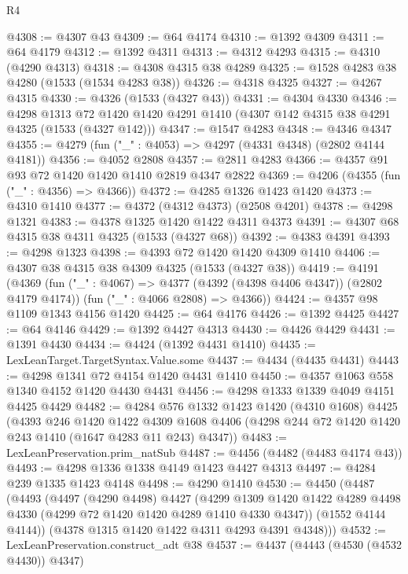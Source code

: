 \begin{lexlean}{R4}
\begin{coremodule}
@4308 := @4307 @43
@4309 := @64 @4174
@4310 := @1392 @4309
@4311 := @64 @4179
@4312 := @1392 @4311
@4313 := @4312 @4293
@4315 := @4310 (@4290 @4313)
@4318 := @4308 @4315 @38 @4289
@4325 := @1528 @4283 @38 @4280 (@1533 (@1534 @4283 @38))
@4326 := @4318 @4325
@4327 := @4267 @4315
@4330 := @4326 (@1533 (@4327 @43))
@4331 := @4304 @4330
@4346 := @4298
    @1313
    @72
    @1420
    @1420
    @4291
    @1410
    (@4307 @142 @4315 @38 @4291 @4325 (@1533 (@4327 @142)))
@4347 := @1547 @4283
@4348 := @4346 @4347
@4355 := @4279 (fun ("_" : @4053) => @4297 (@4331 @4348) (@2802 @4144 @4181))
@4356 := @4052 @2808
@4357 := @2811 @4283
@4366 := @4357 @91 @93 @72 @1420 @1420 @1410 @2819 @4347 @2822
@4369 := @4206 (@4355 (fun ("_" : @4356) => @4366))
@4372 := @4285 @1326 @1423 @1420
@4373 := @4310 @1410
@4377 := @4372 (@4312 @4373) (@2508 @4201)
@4378 := @4298 @1321
@4383 := @4378 @1325 @1420 @1422 @4311 @4373
@4391 := @4307 @68 @4315 @38 @4311 @4325 (@1533 (@4327 @68))
@4392 := @4383 @4391
@4393 := @4298 @1323
@4398 := @4393 @72 @1420 @1420 @4309 @1410
@4406 := @4307 @38 @4315 @38 @4309 @4325 (@1533 (@4327 @38))
@4419 := @4191
    (@4369
      (fun ("_" : @4067) => @4377 (@4392 (@4398 @4406 @4347)) (@2802 @4179 @4174))
      (fun ("_" : @4066 @2808) => @4366))
@4424 := @4357 @98 @1109 @1343 @4156 @1420
@4425 := @64 @4176
@4426 := @1392 @4425
@4427 := @64 @4146
@4429 := @1392 @4427 @4313
@4430 := @4426 @4429
@4431 := @1391 @4430
@4434 := @4424 (@1392 @4431 @1410)
@4435 := LexLeanTarget.TargetSyntax.Value.some
@4437 := @4434 (@4435 @4431)
@4443 := @4298 @1341 @72 @4154 @1420 @4431 @1410
@4450 := @4357 @1063 @558 @1340 @4152 @1420 @4430 @4431
@4456 := @4298 @1333 @1339 @4049 @4151 @4425 @4429
@4482 := @4284
    @576
    @1332
    @1423
    @1420
    (@4310 @1608)
    @4425
    (@4393
      @246
      @1420
      @1422
      @4309
      @1608
      @4406
      (@4298 @244 @72 @1420 @1420 @243 @1410 (@1647 @4283 @11 @243) @4347))
@4483 := LexLeanPreservation.prim_natSub
@4487 := @4456 (@4482 (@4483 @4174 @43))
@4493 := @4298 @1336 @1338 @4149 @1423 @4427 @4313
@4497 := @4284 @239 @1335 @1423 @4148
@4498 := @4290 @1410
@4530 := @4450
    (@4487
      (@4493
        (@4497
          (@4290 @4498)
          @4427
          (@4299
            @1309
            @1420
            @1422
            @4289
            @4498
            @4330
            (@4299 @72 @1420 @1420 @4289 @1410 @4330 @4347))
          (@1552 @4144 @4144))
        (@4378 @1315 @1420 @1422 @4311 @4293 @4391 @4348)))
@4532 := LexLeanPreservation.construct_adt @38
@4537 := @4437 (@4443 (@4530 (@4532 @4430)) @4347)

\end{coremodule}
\end{lexlean}
